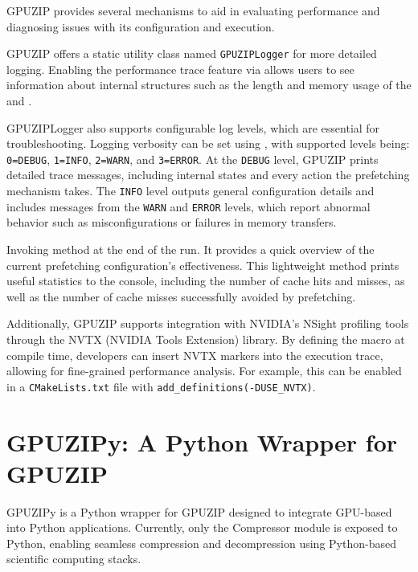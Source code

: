 \documentclass[Ingles]{ic-tese-v3}
\begin{document}
GPUZIP provides several mechanisms to aid in evaluating performance and diagnosing issues with its configuration and execution.

GPUZIP offers a static utility class named \texttt{GPUZIPLogger} for more detailed logging. Enabling the performance trace feature via  allows users to see information about internal structures such as the length and memory usage of the \cache and \pool.

GPUZIPLogger also supports configurable log levels, which are essential for troubleshooting. Logging verbosity can be set using , with supported levels being: \texttt{0=DEBUG}, \texttt{1=INFO}, \texttt{2=WARN}, and \texttt{3=ERROR}. At the \texttt{DEBUG} level, GPUZIP prints detailed trace messages, including internal \cache states and every action the prefetching mechanism takes. The \texttt{INFO} level outputs general configuration details and includes messages from the \texttt{WARN} and \texttt{ERROR} levels, which report abnormal behavior such as misconfigurations or failures in memory transfers.

Invoking  method at the end of the run. It provides a quick overview of the current prefetching configuration's effectiveness. This lightweight method prints useful statistics to the console, including the number of cache hits and misses, as well as the number of cache misses successfully avoided by prefetching.

Additionally, GPUZIP supports integration with NVIDIA's NSight profiling tools through the NVTX (NVIDIA Tools Extension) library. By defining the macro  at compile time, developers can insert NVTX markers into the execution trace, allowing for fine-grained performance analysis. For example, this can be enabled in a \texttt{CMakeLists.txt} file with \texttt{add\_definitions(-DUSE\_NVTX)}.

\section{GPUZIPy: A Python Wrapper for GPUZIP}
\label{sec:gpuzipy}

GPUZIPy is a Python wrapper for GPUZIP designed to integrate GPU-based \compression into Python applications. Currently, only the Compressor module is exposed to Python, enabling seamless compression and decompression using Python-based scientific computing stacks.
\end{document}
